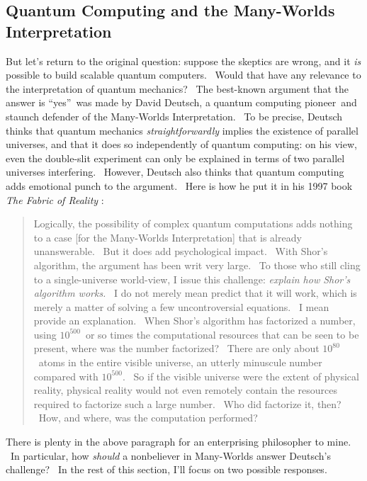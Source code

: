 \documentclass[11pt,onecolumn]{article}%
\begin{document}
\subsection{Quantum Computing and the Many-Worlds Interpretation\label{MWI}}

But let's return to the original question: suppose the skeptics are wrong, and
it \textit{is} possible to build scalable quantum computers. \ Would that have
any relevance to the interpretation of quantum mechanics? \ The best-known
argument that the answer is \textquotedblleft yes\textquotedblright\ was made
by David Deutsch, a quantum computing pioneer\ and staunch defender of the
Many-Worlds Interpretation. \ To be precise, Deutsch thinks that quantum
mechanics \textit{straightforwardly} implies the existence of parallel
universes, and that it does so independently of quantum computing: on his
view, even the double-slit experiment can only be explained in terms of two
parallel universes interfering. \ However, Deutsch also thinks that quantum
computing adds emotional punch to the argument. \ Here is how he put it in his
1997 book \textit{The Fabric of Reality} \cite[p. 217]{deutsch}:

\begin{quotation}
\noindent Logically, the possibility of complex quantum computations adds
nothing to a case [for the Many-Worlds Interpretation] that is already
unanswerable. \ But it does add psychological impact. \ With Shor's algorithm,
the argument has been writ very large. \ To those who still cling to a
single-universe world-view, I issue this challenge: \textit{explain how Shor's
algorithm works.} \ I do not merely mean predict that it will work, which is
merely a matter of solving a few uncontroversial equations. \ I mean provide
an explanation. \ When Shor's algorithm has factorized a number, using
$10^{500}$\ or so times the computational resources that can be seen to be
present, where was the number factorized? \ There are only about $10^{80}%
$\ atoms in the entire visible universe, an utterly minuscule number compared
with $10^{500}$. \ So if the visible universe were the extent of physical
reality, physical reality would not even remotely contain the resources
required to factorize such a large number. \ Who did factorize it, then?
\ How, and where, was the computation performed?
\end{quotation}

There is plenty in the above paragraph for an enterprising philosopher to
mine. \ In particular, how \textit{should} a nonbeliever in Many-Worlds answer
Deutsch's challenge? \ In the rest of this section, I'll focus on two possible responses.
\end{document}
